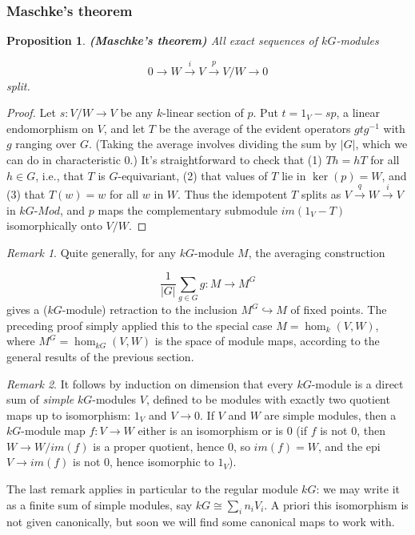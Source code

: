 \documentclass[12pt,titlepage]{article}
\theoremstyle{plain}
\newtheorem{prop}{Proposition}
\theoremstyle{definition}
\theoremstyle{remark}
\newtheorem{remark}{Remark}
\begin{document}
\hypertarget{maschkes_theorem}{}\subsubsection*{{Maschke's theorem}}\label{maschkes_theorem}

\begin{prop}
\label{Maschke}\hypertarget{Maschke}{}
\textbf{(Maschke's theorem)} All exact sequences of $k G$-modules

\begin{displaymath}
0 \to W \stackrel{i}{\to} V \stackrel{p}{\to} V/W \to 0
\end{displaymath}
split.

\end{prop}
\begin{proof}
Let $s: V/W \to V$ be any $k$-linear section of $p$. Put $t = 1_V - s p$, a linear endomorphism on $V$, and let $T$ be the average of the evident operators $g t g^{-1}$ with $g$ ranging over $G$. (Taking the average involves dividing the sum by ${|G|}$, which we can do in characteristic $0$.) It's straightforward to check that (1) $T h = h T$ for all $h \in G$, i.e., that $T$ is $G$-equivariant, (2) that values of $T$ lie in $\ker(p) = W$, and (3) that $T(w) = w$ for all $w$ in $W$. Thus the idempotent $T$ splits as $V \stackrel{q}{\to} W \stackrel{i}{\to} V$ in $k G$-$Mod$, and $p$ maps the complementary submodule $im(1_V - T)$ isomorphically onto $V/W$.

\end{proof}
\begin{remark}
\label{average}\hypertarget{average}{}
Quite generally, for any $k G$-module $M$, the averaging construction

\begin{displaymath}
\frac1{{|G|}} \sum_{g \in G} g: M \to M^G
\end{displaymath}
gives a ($k G$-module) retraction to the inclusion $M^G \hookrightarrow M$ of fixed points. The preceding proof simply applied this to the special case $M = \hom_k(V, W)$, where $M^G = \hom_{k G}(V, W)$ is the space of module maps, according to the general results of the previous section.

\end{remark}
\begin{remark}
\label{decomp}\hypertarget{decomp}{}
It follows by induction on dimension that every $k G$-module is a direct sum of \emph{simple} $k G$-modules $V$, defined to be modules with exactly two quotient maps up to isomorphism: $1_V$ and $V \to 0$. If $V$ and $W$ are simple modules, then a $k G$-module map $f: V \to W$ either is an isomorphism or is $0$ (if $f$ is not $0$, then $W \to W/im(f)$ is a proper quotient, hence $0$, so $im(f) = W$, and the epi $V \to im(f)$ is not $0$, hence isomorphic to $1_V$).

\end{remark}
The last remark applies in particular to the regular module $k G$: we may write it as a finite sum of simple modules, say $k G \cong \sum_i n_i V_i$. A priori this isomorphism is not given canonically, but soon we will find some canonical maps to work with.
\end{document}

